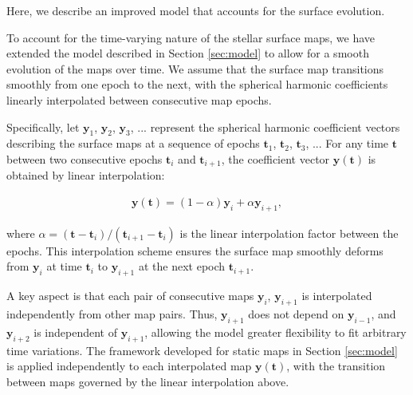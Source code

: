\documentclass[twocolumn]{aastex631}
\begin{document}
Here, we describe an improved model that accounts for the surface evolution.

To account for the time-varying nature of the stellar surface maps, we have extended the model described in Section \ref{sec:model} to allow 
for a smooth evolution of the maps over time. We assume that the surface map transitions smoothly from one epoch to the next, with the spherical harmonic 
coefficients linearly interpolated between consecutive map epochs. 

Specifically, let $\pmb{y}_1$, $\pmb{y}_2$, $\pmb{y}_3$, ... represent the spherical harmonic coefficient vectors describing the surface maps at a 
sequence of epochs $\pmb{t}_1$, $\pmb{t}_2$, $\pmb{t}_3$, ... For any time $\pmb{t}$ between two consecutive epochs $\pmb{t}_i$ and $\pmb{t}_{i+1}$, 
the coefficient vector $\pmb{y(t)}$ is obtained by linear interpolation:
\begin{linenomath}\begin{align}\label{linearinterp}
    \pmb{y(t)} = (1 - \alpha)\pmb{y}_i + \alpha\pmb{y}_{i+1},
\end{align}\end{linenomath}

where $\alpha = (\pmb{t} - \pmb{t}_i) / (\pmb{t}_{i+1} - \pmb{t}_i)$ is the linear interpolation factor between the epochs. 
This interpolation scheme ensures the surface map smoothly deforms from $\pmb{y}_i$ at time $\pmb{t}_i$ to $\pmb{y}_{i+1}$ at the next epoch $\pmb{t}_{i+1}$.

A key aspect is that each pair of consecutive maps $\pmb{y}_i$, $\pmb{y}_{i+1}$ is interpolated independently from other map pairs. 
Thus, $\pmb{y}_{i+1}$ does not depend on $\pmb{y}_{i-1}$, and $\pmb{y}_{i+2}$ is independent of $\pmb{y}_{i+1}$, allowing the model greater 
flexibility to fit arbitrary time variations. The framework developed for static maps in Section \ref{sec:model} is applied independently 
to each interpolated map $\pmb{y(t)}$, with the transition between maps governed by the linear interpolation above.

\end{document}
